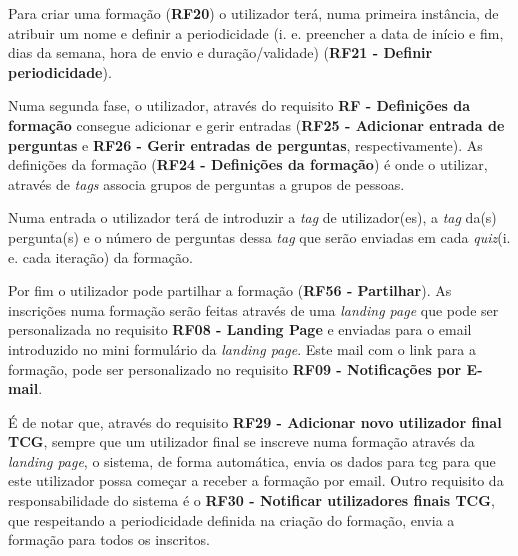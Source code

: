 Para criar uma formação (\textbf{RF20}) o utilizador terá, numa primeira instância, de atribuir um nome e definir a periodicidade (i. e. preencher a data de início e fim, dias da semana, hora de envio e  duração/validade) (\textbf{RF21 - Definir periodicidade}). 

Numa segunda fase, o utilizador, através do requisito \textbf{RF - Definições da formação} consegue adicionar e gerir entradas (\textbf{RF25 - Adicionar entrada de perguntas} e \textbf{RF26 - Gerir entradas de perguntas}, respectivamente). As definições da formação (\textbf{RF24 - Definições da formação}) é onde o utilizar, através de \textit{tags} associa grupos de perguntas a grupos de pessoas. 

Numa entrada o utilizador terá de introduzir a \textit{tag} de utilizador(es), a \textit{tag} da(s) pergunta(s) e o número de perguntas dessa \textit{tag} que serão enviadas em cada \textit{quiz}(i. e. cada iteração) da formação.

Por fim o utilizador pode partilhar a formação (\textbf{RF56 - Partilhar}). As inscrições numa formação serão feitas através de uma \textit{landing page} que pode ser personalizada no requisito \textbf{RF08 - Landing Page} e enviadas para o email introduzido no mini formulário da \textit{landing page}. Este mail com o link para a formação, pode ser personalizado no requisito \textbf{RF09 - Notificações por E-mail}. 

É de notar que, através do requisito \textbf{RF29 - Adicionar novo utilizador final TCG}, sempre que um utilizador final se inscreve numa formação através da \textit{landing page}, o sistema, de forma automática, envia os dados para \acrshort{tcg} para que este utilizador possa começar a receber a formação por email. Outro requisito da responsabilidade do sistema é o \textbf{RF30 - Notificar utilizadores finais TCG}, que respeitando a periodicidade definida na criação do formação, envia a formação para todos os inscritos.



